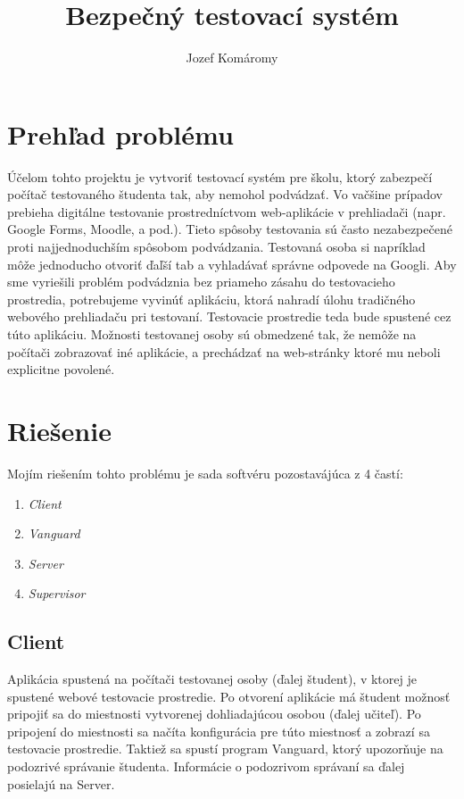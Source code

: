 \documentclass{article}
\begin{document}
\title{Bezpečný testovací systém}
\author{Jozef Komáromy}

\maketitle

\section{Prehľad problému}

Účelom tohto projektu je vytvoriť testovací systém pre školu, ktorý zabezpečí počítač testovaného študenta tak, aby nemohol podvádzať. Vo vačšine prípadov prebieha digitálne testovanie prostredníctvom web-aplikácie v prehliadači (napr. Google Forms, Moodle, a pod.). Tieto spôsoby testovania sú často nezabezpečené proti najjednoduchším spôsobom podvádzania. Testovaná osoba si napríklad môže jednoducho otvoriť ďaľší tab a vyhladávať správne odpovede na Googli. Aby sme vyriešili problém podvádznia bez priameho zásahu do testovacieho prostredia, potrebujeme vyvinúť aplikáciu, ktorá nahradí úlohu tradičného webového prehliadaču pri testovaní. Testovacie prostredie teda bude spustené cez túto aplikáciu. Možnosti testovanej osoby sú obmedzené tak, že nemôže na počítači zobrazovať iné aplikácie, a prechádzať na web-stránky ktoré mu neboli explicitne povolené.

\section{Riešenie}

Mojím riešením tohto problému je sada softvéru pozostavájúca z 4 častí:
\begin{enumerate}
  \item \emph{Client}
  \item \emph{Vanguard}
  \item \emph{Server}
  \item \emph{Supervisor}
\end{enumerate}

\subsection{Client}

Aplikácia spustená na počítači testovanej osoby (ďalej študent), v ktorej je spustené webové testovacie prostredie. Po otvorení aplikácie má študent možnosť pripojiť sa do miestnosti vytvorenej dohliadajúcou osobou (ďalej učiteľ). Po pripojení do miestnosti sa načíta konfigurácia pre túto miestnosť a zobrazí sa testovacie prostredie. Taktiež sa spustí program Vanguard, ktorý upozorňuje na podozrivé správanie študenta. Informácie o podozrivom správaní sa ďalej posielajú na Server.
\end{document}
